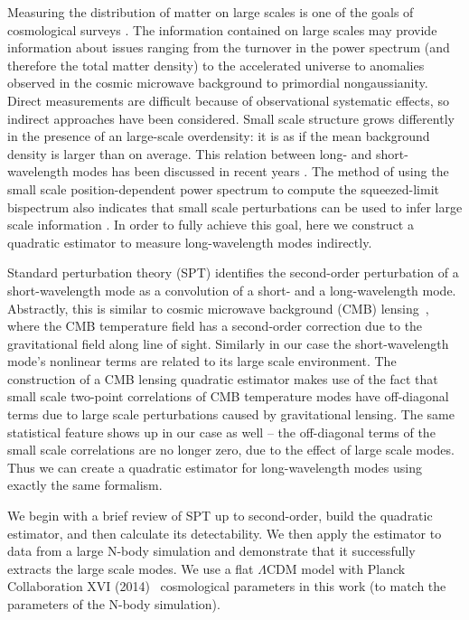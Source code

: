 \documentclass[prd,amsmath,amssymb,floatfix,superscriptaddress,nofootinbib,twocolumn]{revtex4-1}
\begin{document}
Measuring the distribution of matter on large scales is one of the goals of cosmological surveys \cite{LSST:2012ls}\cite{Wfirst:2012jg}. The information contained on large scales may provide information about issues ranging from the turnover in the power spectrum (and therefore the total matter density) to the accelerated universe to anomalies observed in the cosmic microwave background to primordial nongaussianity. Direct measurements are difficult because of observational systematic effects, so indirect approaches have been considered. Small scale structure grows differently in the presence of an large-scale overdensity: it is as if the mean background density is larger than on average. This relation between long- and short-wavelength modes has been discussed in recent years \cite{Masui:2010prim}\cite{Baldauf:2011fer}\cite{Jeong:2012foss}\cite{Li:2014ssc}\cite{Zhu:2016tidal}\cite{Barreira:2017res}\cite{Zhu:2018cm}. The method of using the small scale position-dependent power spectrum to compute the squeezed-limit bispectrum also indicates that small scale perturbations can be used to infer large scale information \cite{Chiang:2014pos}\cite{Chiang:2015poss}. In order to fully achieve this goal, here we construct a quadratic estimator to measure long-wavelength modes indirectly. 

Standard perturbation theory (SPT) \cite{Goroff:1986sts}\cite{Makino:1992fs}\cite{Jain:1994sop} identifies the second-order perturbation of a short-wavelength mode as a convolution of a short- and a long-wavelength mode. Abstractly, this is similar to
cosmic microwave background (CMB) lensing~\cite{Hu:2001dt}\cite{Hu:2002mr}, where the CMB temperature field has a second-order correction due to the gravitational field along line of sight. Similarly in our case the short-wavelength mode's nonlinear terms are related to its large scale environment.
The construction of a CMB lensing quadratic estimator makes use of the fact that small scale two-point correlations of CMB temperature modes have off-diagonal terms due to large scale perturbations caused by gravitational lensing. The same statistical feature shows up in our case as well -- the off-diagonal terms of the small scale correlations are no longer zero, due to the effect of large scale modes. Thus we can create a quadratic estimator for long-wavelength modes using exactly the same formalism. 

We begin with a brief review of SPT up to second-order, build the quadratic estimator, and then calculate its detectability. We then apply the estimator to data from a large N-body simulation and demonstrate that it successfully extracts the large scale modes. 
We use a flat $\Lambda$CDM model with Planck Collaboration XVI (2014)~\cite{Planck:2014cos} cosmological parameters in this work (to match the parameters of the N-body simulation).
\end{document}
